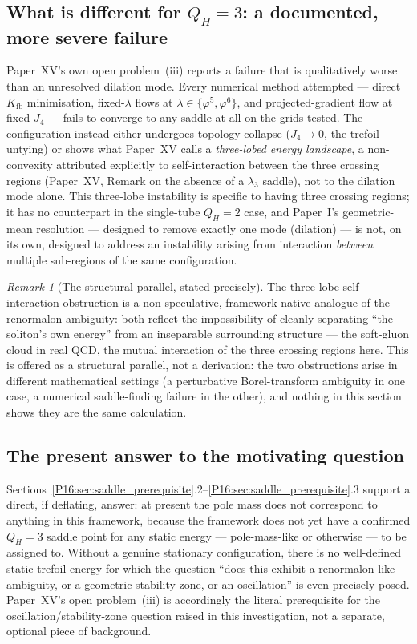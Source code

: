 \documentclass[11pt,a4paper]{article}
\theoremstyle{definition}\newtheorem{definition}[theorem]{Definition}
\theoremstyle{remark}
\newtheorem{remark}[theorem]{Remark}
\theoremstyle{definition}\newtheorem{construction}[theorem]{Construction}
\newcommand{\vp}{\varphi}
\newcommand{\lam}{\lambda}
\newcommand{\Kfb}{K_{\mathrm{fb}}}
\newcommand{\QH}{Q_H}
\begin{document}
\subsection{What is different for $\QH=3$: a documented, more severe
  failure}

Paper~XV's own open problem~(iii) reports a failure that is
qualitatively worse than an unresolved dilation mode. Every numerical
method attempted --- direct $\Kfb$ minimisation, fixed-$\lam$ flows at
$\lam\in\{\vp^5,\vp^6\}$, and projected-gradient flow at fixed $J_4$
--- fails to converge to any saddle at all on the grids tested. The
configuration instead either undergoes topology collapse ($J_4\to0$,
the trefoil untying) or shows what Paper~XV calls a \emph{three-lobed
energy landscape}, a non-convexity attributed explicitly to
self-interaction between the three crossing regions (Paper~XV,
Remark on the absence of a $\lam_3$ saddle), not to the dilation mode
alone. This three-lobe instability is specific to having three
crossing regions; it has no counterpart in the single-tube $\QH=2$
case, and Paper~I's geometric-mean resolution --- designed to remove
exactly one mode (dilation) --- is not, on its own, designed to
address an instability arising from interaction \emph{between}
multiple sub-regions of the same configuration.

\begin{remark}[The structural parallel, stated precisely]
\label{P16:rem:saddle_renormalon_parallel}
The three-lobe self-interaction obstruction is a non-speculative,
framework-native analogue of the renormalon ambiguity: both reflect
the impossibility of cleanly separating ``the soliton's own energy''
from an inseparable surrounding structure --- the soft-gluon cloud in
real QCD, the mutual interaction of the three crossing regions here.
This is offered as a structural parallel, not a derivation: the two
obstructions arise in different mathematical settings (a perturbative
Borel-transform ambiguity in one case, a numerical saddle-finding
failure in the other), and nothing in this section shows they are the
same calculation.
\end{remark}

\subsection{The present answer to the motivating question}

Sections~\ref{P16:sec:saddle_prerequisite}.2--\ref{P16:sec:saddle_prerequisite}.3
support a direct, if deflating, answer: at present the pole mass does
not correspond to anything in this framework, because the framework
does not yet have a confirmed $\QH=3$ saddle point for any static
energy --- pole-mass-like or otherwise --- to be assigned to. Without
a genuine stationary configuration, there is no well-defined static
trefoil energy for which the question ``does this exhibit a
renormalon-like ambiguity, or a geometric stability zone, or an
oscillation'' is even precisely posed. Paper~XV's open problem~(iii)
is accordingly the literal prerequisite for the oscillation/stability-zone
question raised in this investigation, not a separate, optional piece
of background.
\end{document}
